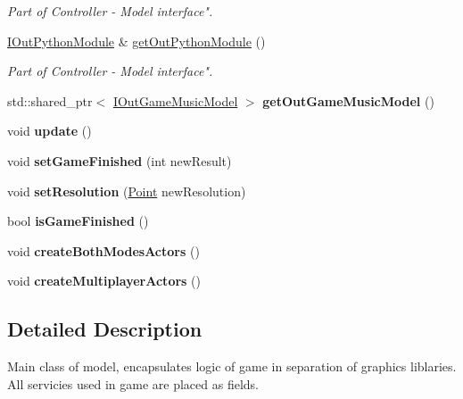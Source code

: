 \begin{DoxyCompactItemize}
\begin{DoxyCompactList}\small\item\em Part of Controller -\/ Model interface". \end{DoxyCompactList}\item 
\hyperlink{classIOutPythonModule}{I\+Out\+Python\+Module} \& \hyperlink{classGame_a957736283b0b0a9301619b8572dd0f3a}{get\+Out\+Python\+Module} ()
\begin{DoxyCompactList}\small\item\em Part of Controller -\/ Model interface". \end{DoxyCompactList}\item 
std\+::shared\+\_\+ptr$<$ \hyperlink{classIOutGameMusicModel}{I\+Out\+Game\+Music\+Model} $>$ {\bfseries get\+Out\+Game\+Music\+Model} ()\hypertarget{classGame_ae4aaf0e34cdb3b6f9b92f413e3fd18a6}{}\label{classGame_ae4aaf0e34cdb3b6f9b92f413e3fd18a6}

\item 
void {\bfseries update} ()\hypertarget{classGame_a79df6376b332d63c9eca0dcee30305c3}{}\label{classGame_a79df6376b332d63c9eca0dcee30305c3}

\item 
void {\bfseries set\+Game\+Finished} (int new\+Result)\hypertarget{classGame_a4d87901dd606b9f465ca0ff3ac85b801}{}\label{classGame_a4d87901dd606b9f465ca0ff3ac85b801}

\item 
void {\bfseries set\+Resolution} (\hyperlink{classPoint}{Point} new\+Resolution)\hypertarget{classGame_a507e1c1cab6653f2f7727ac020b46db2}{}\label{classGame_a507e1c1cab6653f2f7727ac020b46db2}

\item 
bool {\bfseries is\+Game\+Finished} ()\hypertarget{classGame_ac210ecbd163be2aa4ad7ae0871656874}{}\label{classGame_ac210ecbd163be2aa4ad7ae0871656874}

\item 
void {\bfseries create\+Both\+Modes\+Actors} ()\hypertarget{classGame_a138adec32f0567e7b027d23e5efee9bc}{}\label{classGame_a138adec32f0567e7b027d23e5efee9bc}

\item 
void {\bfseries create\+Multiplayer\+Actors} ()\hypertarget{classGame_a059bb7a37176b2a121b3309a114fc8bc}{}\label{classGame_a059bb7a37176b2a121b3309a114fc8bc}

\end{DoxyCompactItemize}


\subsection{Detailed Description}
Main class of model, encapsulates logic of game in separation of graphics liblaries. All servicies used in game are placed as fields. 

